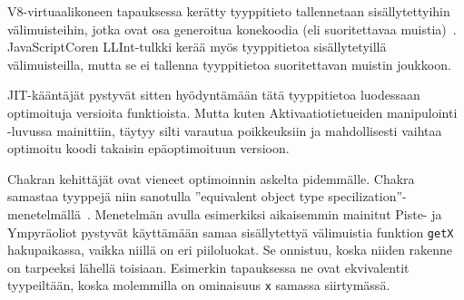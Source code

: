 V8-virtuaalikoneen tapauksessa kerätty tyyppitieto tallennetaan sisällytettyihin välimuisteihin, jotka ovat osa generoitua konekoodia (eli suoritettavaa muistia)~\cite{llint}. JavaScriptCoren LLInt-tulkki kerää myös tyyppitietoa sisällytetyillä välimuisteilla, mutta se ei tallenna tyyppitietoa suoritettavan muistin joukkoon.

JIT-kääntäjät pystyvät sitten hyödyntämään tätä tyyppitietoa luodessaan optimoituja versioita funktioista. Mutta kuten Aktivaatiotietueiden manipulointi -luvussa mainittiin, täytyy silti varautua poikkeuksiin ja mahdollisesti vaihtaa optimoitu koodi takaisin epäoptimoituun versioon.

Chakran kehittäjät ovat vieneet optimoinnin askelta pidemmälle. Chakra samastaa tyyppejä niin sanotulla ''equivalent object type specilization''-menetelmällä~\cite{chakra}. Menetelmän avulla esimerkiksi aikaisemmin mainitut Piste- ja Ympyräoliot pystyvät käyttämään samaa sisällytettyä välimuistia funktion \texttt{getX} hakupaikassa, vaikka niillä on eri piiloluokat. Se onnistuu, koska niiden rakenne on tarpeeksi lähellä toisiaan. Esimerkin tapauksessa ne ovat ekvivalentit tyypeiltään, koska molemmilla on ominaisuus \texttt{x} samassa siirtymässä.

\begin{comment}
\begin{itemize}
\item \url{https://wiki.mozilla.org/TypeInference}
\item SpiderMonkey: Staattisen ja dynaamisen päättelyn yhdistelmä!
\item \url{https://trac.webkit.org/wiki/JavaScriptCore#TypeInference}
\end{itemize}
\end{comment}